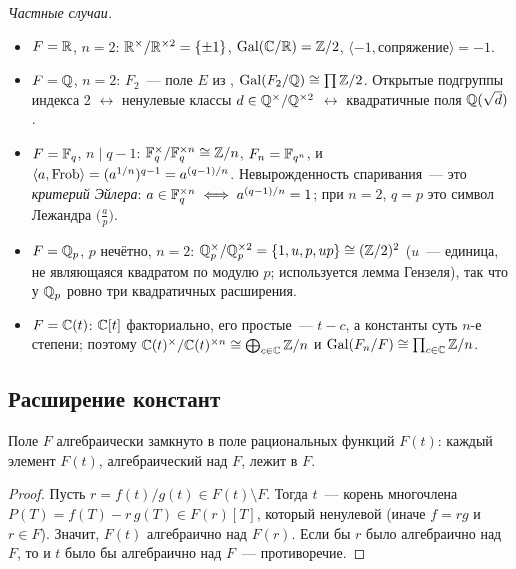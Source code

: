 \begin{example}[7.37]
\emph{Частные случаи.}
\begin{itemize}[leftmargin=*]
\item $F=\mathbb R$, $n=2$: $\mathbb R^\times/\mathbb R^{\times2}=\{\pm1\}$, $\operatorname{Gal}(\mathbb C/\mathbb R)=\mathbb Z/2$, $\langle-1,\text{сопряжение}\rangle=-1$.
\item $F=\mathbb Q$, $n=2$: $F_2$~--- поле $E$ из , $\operatorname{Gal}(F_2/\mathbb Q)\cong\prod\mathbb Z/2$. Открытые подгруппы индекса 2
$\leftrightarrow$ ненулевые классы $d\in\mathbb Q^\times/\mathbb Q^{\times2}$ $\leftrightarrow$ квадратичные поля $\mathbb Q(\sqrt d)$.
\item $F=\mathbb F_q$, $n\mid q-1$: $\mathbb F_q^\times/\mathbb F_q^{\times n}\cong\mathbb Z/n$, $F_n=\mathbb F_{q^n}$, и
$\langle a,\operatorname{Frob}\rangle=(a^{1/n})^{q-1}=a^{(q-1)/n}$. Невырожденность спаривания~--- это \emph{критерий Эйлера}:
$a\in\mathbb F_q^{\times n}\iff a^{(q-1)/n}=1$; при $n=2$, $q=p$ это символ Лежандра $\bigl(\frac ap\bigr)$.
\item $F=\mathbb Q_p$, $p$ нечётно, $n=2$: $\mathbb Q_p^\times/\mathbb Q_p^{\times2}=\{1,u,p,up\}\cong(\mathbb Z/2)^2$ ($u$~--- единица, не являющаяся
квадратом по модулю $p$; используется лемма Гензеля), так что у $\mathbb Q_p$ ровно три квадратичных расширения.
\item $F=\mathbb C(t)$: $\mathbb C[t]$ факториально, его простые~--- $t-c$, а константы суть $n$-е степени; поэтому
$\mathbb C(t)^\times/\mathbb C(t)^{\times n}\cong\bigoplus_{c\in\mathbb C}\mathbb Z/n$ и $\operatorname{Gal}(F_n/F)\cong\prod_{c\in\mathbb C}\mathbb Z/n$.
\end{itemize}
\end{example}

\subsection*{Расширение констант}

\begin{lemma}[7.38a]
Поле $F$ алгебраически замкнуто в поле рациональных функций $F(t)$: каждый элемент $F(t)$, алгебраический над $F$, лежит в
$F$.
\end{lemma}

\begin{proof}
Пусть $r=f(t)/g(t)\in F(t)\setminus F$. Тогда $t$~--- корень многочлена $P(T)=f(T)-r\,g(T)\in F(r)[T]$, который ненулевой
(иначе $f=rg$ и $r\in F$). Значит, $F(t)$ алгебраично над $F(r)$. Если бы $r$ было алгебраично над $F$, то и $t$ было бы
алгебраично над $F$~--- противоречие.
\end{proof}

